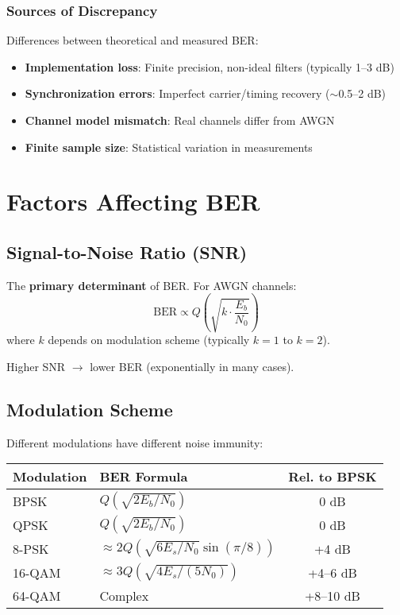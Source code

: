 \subsubsection{Sources of Discrepancy}

Differences between theoretical and measured BER:
\begin{itemize}
\item \textbf{Implementation loss}: Finite precision, non-ideal filters (typically 1--3 dB)
\item \textbf{Synchronization errors}: Imperfect carrier/timing recovery ($\sim$0.5--2 dB)
\item \textbf{Channel model mismatch}: Real channels differ from AWGN
\item \textbf{Finite sample size}: Statistical variation in measurements
\end{itemize}

\section{Factors Affecting BER}

\subsection{Signal-to-Noise Ratio (SNR)}

The \textbf{primary determinant} of BER. For AWGN channels:
\begin{equation}
\mathrm{BER} \propto Q\left(\sqrt{k \cdot \frac{E_b}{N_0}}\right)
\label{eq:ber-snr-relation}
\end{equation}
where $k$ depends on modulation scheme (typically $k = 1$ to $k = 2$).

Higher SNR $\rightarrow$ lower BER (exponentially in many cases).

\subsection{Modulation Scheme}

Different modulations have different noise immunity:

\begin{center}
\begin{tabular}{@{}llc@{}}
\toprule
Modulation & BER Formula & Rel. to BPSK \\
\midrule
BPSK & $Q(\sqrt{2E_b/N_0})$ & 0 dB \\
QPSK & $Q(\sqrt{2E_b/N_0})$ & 0 dB \\
8-PSK & $\approx 2Q(\sqrt{6E_s/N_0}\sin(\pi/8))$ & +4 dB \\
16-QAM & $\approx 3Q(\sqrt{4E_s/(5N_0)})$ & +4--6 dB \\
64-QAM & Complex & +8--10 dB \\
\bottomrule
\end{tabular}
\end{center}


